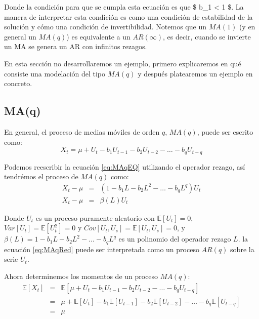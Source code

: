 \documentclass[
]{book}
\begin{document}
Donde la condición para que se cumpla esta ecuación es que \$ \textbar{} b\_1 \textbar{} \textless{} 1 \$. La manera de interpretar esta condición es como una condición de estabilidad de la solución y cómo una condición de invertibilidad. Notemos que un \(MA(1)\) (y en general un \(MA(q)\)) es equivalente a un \(AR(\infty)\), es decir, cuando se invierte un MA se genera un AR con infinitos rezagos.

En esta sección no desarrollaremos un ejemplo, primero explicaremos en qué consiste una modelación del tipo \(MA(q)\) y después platearemos un ejemplo en concreto.

\hypertarget{maq}{%
\subsection{MA(q)}\label{maq}}

En general, el proceso de medias móviles de orden \(q\), \(MA(q)\), puede ser escrito como:
\begin{equation}
    X_t = \mu + U_t - b_1 U_{t-1} - b_2 U_{t-2} - \ldots - b_q U_{t-q}
    \label{eq:MAqEQ}
\end{equation}

Podemos reescribir la ecuación \eqref{eq:MAqEQ} utilizando el operador rezago, así tendrémos el proceso de \(MA(q)\) como:
\begin{eqnarray}
    X_t - \mu & = & (1 - b_1 L - b_2 L^2 - \ldots - b_q L^q) U_{t} \nonumber \\
    X_t - \mu & = & \beta(L) U_t
    \label{eq:MAqRed}
\end{eqnarray}

Donde \(U_t\) es un proceso puramente aleatorio con \(\mathbb{E}[U_t] = 0\), \(Var[U_t] = \mathbb{E}[U_t^2] = 0\) y \(Cov[U_t, U_s] = \mathbb{E}[U_t, U_s] = 0\), y \(\beta(L) = 1 - b_1 L - b_2 L^2 - \ldots - b_q L^q\) es un polinomio del operador rezago \(L\). la ecuación \eqref{eq:MAqRed} puede ser interpretada como un proceso \(AR(q)\) sobre la serie \(U_t\).

Ahora determinemos los momentos de un proceso \(MA(q)\):
\begin{eqnarray}
    \mathbb{E}[X_t] & = & \mathbb{E}[\mu + U_t - b_1 U_{t-1} - b_2 U_{t-2} - \ldots - b_q U_{t-q}] \nonumber \\
    & = & \mu + \mathbb{E}[U_t] - b_1 \mathbb{E}[U_{t-1}] - b_2 \mathbb{E}[U_{t-2}] - \ldots - b_q \mathbb{E}[U_{t-q}] \nonumber \\
    & = & \mu
\end{eqnarray}
\end{document}

